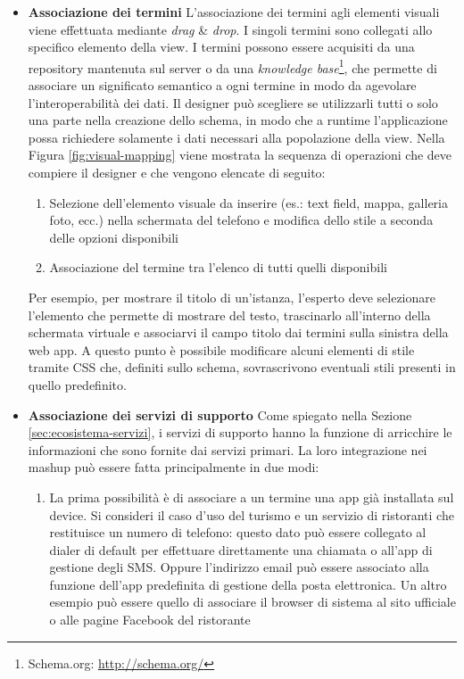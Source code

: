 \begin{itemize}
	\item \textbf{Associazione dei termini} 
	L'associazione dei termini agli elementi visuali viene effettuata mediante \emph{drag} \& \emph{drop}. I singoli termini sono collegati allo specifico elemento della view. 
	I termini possono essere acquisiti da una repository mantenuta sul server o da una \emph{knowledge base}\footnote{Schema.org: \url{http://schema.org/}}, che permette di associare un significato semantico a ogni termine in modo da agevolare l'interoperabilità dei dati. Il designer può scegliere se utilizzarli tutti o solo una parte nella creazione dello schema, in modo che a runtime l'applicazione possa richiedere solamente i dati necessari alla popolazione della view.
	Nella Figura \ref{fig:visual-mapping} viene mostrata la sequenza di operazioni che deve compiere il designer e che vengono elencate di seguito:
	\begin{enumerate}
		\item
		Selezione dell'elemento visuale da inserire (es.: text field, mappa, galleria foto, ecc.) nella schermata del telefono e modifica dello stile a seconda delle opzioni disponibili
		\item
		Associazione del termine tra l'elenco di tutti quelli disponibili
	\end{enumerate}
	Per esempio, per mostrare il titolo di un'istanza, l'esperto deve selezionare l'elemento che permette di mostrare del testo, trascinarlo all'interno della schermata virtuale e associarvi il campo titolo dai termini sulla sinistra della web app. A questo punto è possibile modificare alcuni elementi di stile tramite CSS che, definiti sullo schema, sovrascrivono eventuali stili presenti in quello predefinito.
	\item \textbf{Associazione dei servizi di supporto}
	Come spiegato nella Sezione \ref{sec:ecosistema-servizi}, i servizi di supporto hanno la funzione di arricchire le informazioni che sono fornite dai servizi primari. La loro integrazione nei mashup può essere fatta principalmente in due modi:
	\begin{enumerate}
		\item
		La prima possibilità è di associare a un termine una app già installata sul device. Si consideri il caso d'uso del turismo e un servizio di ristoranti che restituisce un numero di telefono: questo dato può essere collegato al dialer di default per effettuare direttamente una chiamata o all'app di gestione degli SMS. Oppure l'indirizzo email può essere associato alla funzione  dell'app predefinita di gestione della posta elettronica. Un altro esempio può essere quello di associare il browser di sistema al sito ufficiale o alle pagine Facebook del ristorante

\end{enumerate}
\end{itemize}
